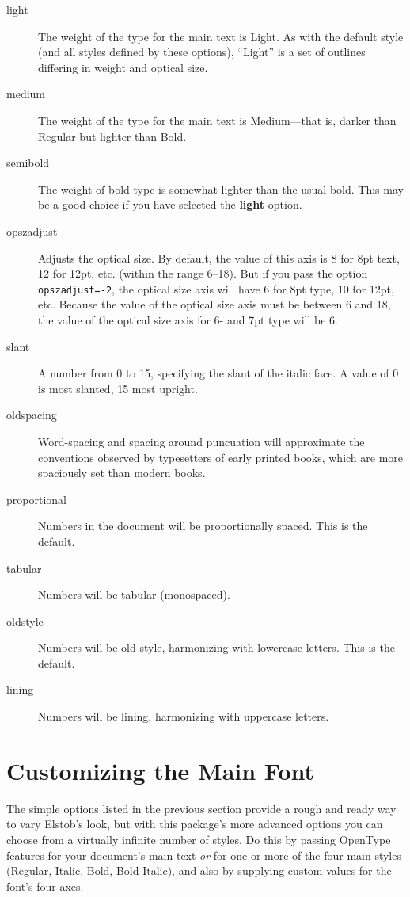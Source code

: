 \documentclass[12pt]{article}
\begin{document}
\begin{description}
    \item[light] The weight of the type for the main text is Light. As with the default
    style (and all styles defined by these options), “Light” is a set of outlines differing
    in weight and optical size.
    \item[medium] The weight of the type for the main text is Medium---that is, darker than
    Regular but lighter than Bold.
    \item[semibold] The weight of bold type is somewhat lighter than the usual bold. This may be a
    good choice if you have selected the \textbf{light} option.
    \item[opszadjust] Adjusts the optical size. By default, the value of this axis
    is 8 for 8pt text, 12 for 12pt, etc. (within the range 6–18). But if you pass the
    option {\verb|opszadjust=-2|}, the optical size axis will have 6 for 8pt type, 10 for
    12pt, etc. Because the value of the optical size axis must be between 6 and 18, the
    value of the optical size axis for 6- and 7pt type will be 6.
    \item[slant] A number from 0 to 15, specifying the slant of the italic face.
    A value of 0 is {\mostslanted most slanted}, 15 {\leastslanted most upright}.
    \item[oldspacing] Word-spacing and spacing around puncuation will approximate the conventions
    observed by typesetters of early printed books, which are more spaciously set than
    modern books.
    \item[proportional] Numbers in the document will be proportionally spaced. This is the default.
    \item[tabular] Numbers will be tabular (monospaced).
    \item[oldstyle] Numbers will be old-style, harmonizing with lowercase letters. This is the default.
    \item[lining] Numbers will be lining, harmonizing with uppercase letters.
\end{description}

\section{Customizing the Main Font}

The simple options listed in the previous section provide a rough and ready
way to vary Elstob's look, but with this package's more advanced options you can choose
from a virtually infinite number of styles. Do this by passing OpenType features 
for your document's main text \emph{or} for one or more of the four main styles
(Regular, Italic, Bold, Bold Italic), and also by supplying custom values for the
font's four axes.
\end{document}
